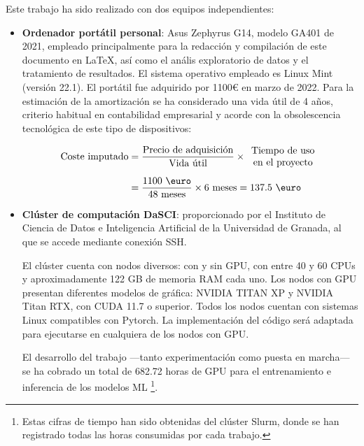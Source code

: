 Este trabajo ha sido realizado con dos equipos independientes: 

\begin{itemize}
    \item \textbf{Ordenador portátil personal}: Asus Zephyrus G14, modelo GA401 de 2021, empleado principalmente para la redacción y compilación de este documento en \LaTeX, así como el anális exploratorio de datos y el tratamiento de resultados. El sistema operativo empleado es Linux Mint (versión 22.1).
    El portátil fue adquirido por 1100\euro{} en marzo de 2022. Para la estimación de la amortización se ha considerado una vida útil de 4 años, criterio habitual en contabilidad empresarial y acorde con la obsolescencia tecnológica de este tipo de dispositivos:

    \begin{align*}
    \text{Coste imputado} 
    &= \frac{\text{Precio de adquisición}}{\text{Vida útil}} \times 
    \begin{array}{c}
        \text{Tiempo de uso} \\ 
        \text{en el proyecto}
    \end{array} \\[1ex]
    &= \frac{1100 \text{ \euro}}{48 \text{ meses}} \times 6 \text{ meses} = 137.5 \text{ \euro}
    \end{align*}

    \item \textbf{Clúster de computación DaSCI}: proporcionado por el Instituto de Ciencia de Datos e Inteligencia Artificial de la Universidad de Granada, al que se accede mediante conexión SSH. 
    
    El clúster cuenta con nodos diversos: con y sin GPU, con entre 40 y 60 CPUs y aproximadamente 122 GB de memoria RAM cada uno. Los nodos con GPU presentan diferentes modelos de gráfica: NVIDIA TITAN XP y NVIDIA Titan RTX, con CUDA 11.7 o superior. Todos los nodos cuentan con sistemas Linux compatibles con Pytorch.
    La implementación del código será adaptada para ejecutarse en cualquiera de los nodos con GPU. 

    El desarrollo del trabajo ---tanto experimentación como puesta en marcha--- se ha cobrado un total de 682.72 horas de GPU para el entrenamiento e inferencia de los modelos ML%
    \footnote{
        Estas cifras de tiempo han sido obtenidas del clúster Slurm, donde se han registrado todas las horas consumidas por cada trabajo. 
    }.  


\end{itemize}
